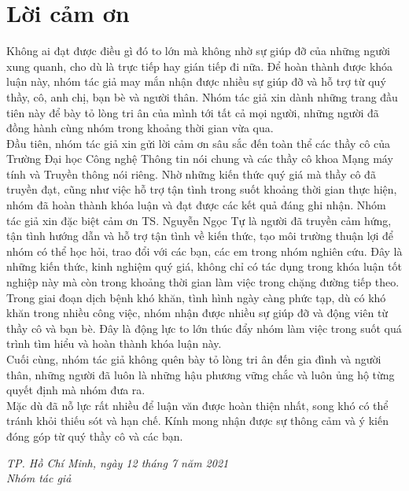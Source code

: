 \chapter*{\centering\Large{Lời cảm ơn}}
Không ai đạt được điều gì đó to lớn mà không nhờ sự giúp đỡ của những
người xung quanh, cho dù là trực tiếp hay gián tiếp đi nữa. Để hoàn thành được
khóa luận này, nhóm tác giả may mắn nhận được nhiều sự giúp đỡ và hỗ trợ từ
quý thầy, cô, anh chị, bạn bè và người thân. Nhóm tác giả xin dành những trang
đầu tiên này để bày tỏ lòng tri ân của mình tới tất cả mọi người, những người đã
đồng hành cùng nhóm trong khoảng thời gian vừa qua. \\
\indent Đầu tiên, nhóm tác giả xin gửi lời cảm ơn sâu sắc đến toàn thể các thầy cô
của Trường Đại học Công nghệ Thông tin nói chung và các thầy cô khoa Mạng
máy tính và Truyền thông nói riêng. Nhờ những kiến thức quý giá mà thầy cô đã
truyền đạt, cũng như việc hỗ trợ tận tình trong suốt khoảng thời gian thực hiện,
nhóm đã hoàn thành khóa luận và đạt được các kết quả đáng ghi nhận.
Nhóm tác giả xin đặc biệt cảm ơn TS. Nguyễn Ngọc Tự là người đã truyền
cảm hứng, tận tình hướng dẫn và hỗ trợ tận tình về kiến thức, tạo môi trường thuận
lợi để nhóm có thể học hỏi, trao đổi với các bạn, các em trong nhóm nghiên cứu.
Đây là những kiến thức, kinh nghiệm quý giá, không chỉ có tác dụng trong khóa
luận tốt nghiệp này mà còn trong khoảng thời gian làm việc trong chặng đường
tiếp theo. \\
\indent Trong giai đoạn dịch bệnh khó khăn, tình hình ngày càng phức tạp, dù có
khó khăn trong nhiều công việc, nhóm nhận được nhiều sự giúp đỡ và động viên
từ thầy cô và bạn bè. Đây là động lực to lớn thúc đẩy nhóm làm việc trong suốt
quá trình tìm hiểu và hoàn thành khóa luận này. \\
\indent Cuối cùng, nhóm tác giả không quên bày tỏ lòng tri ân đến gia đình và người
thân, những người đã luôn là những hậu phương vững chắc và luôn ủng hộ từng
quyết định mà nhóm đưa ra. \\
\indent Mặc dù đã nỗ lực rất nhiều để luận văn được hoàn thiện nhất, song khó có
thể tránh khỏi thiếu sót và hạn chế. Kính mong nhận được sự thông cảm và ý kiến
đóng góp từ quý thầy cô và các bạn.\\

\begin{flushright}
\textit {TP. Hồ Chí Minh, ngày 12 tháng 7 năm 2021} \\
\textit {Nhóm tác giả}
\end{flushright}

